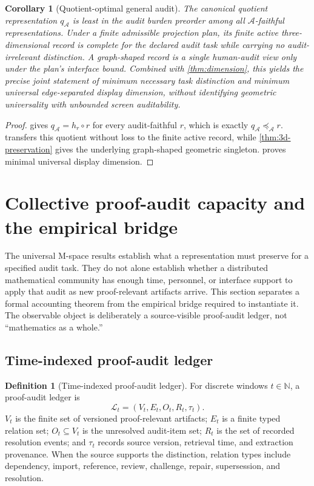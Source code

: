 \documentclass[11pt]{article}
\newcommand{\N}{\mathbb N}
\newcommand{\qA}{q_{\mathcal A}}
\newcommand{\mcA}{\mathcal A}
\newcommand{\Ledger}{\ensuremath{\mathscr L}}
\theoremstyle{plain}
\newtheorem{corollary}[theorem]{Corollary}
\theoremstyle{definition}
\newtheorem{definition}[theorem]{Definition}
\theoremstyle{remark}
\begin{document}
\begin{corollary}[Quotient-optimal general audit]
\label{cor:maxaud}
The canonical quotient representation $\qA$ is least in the audit burden preorder among all $\mcA$-faithful representations.  Under a finite admissible projection plan, its finite active three-dimensional record is complete for the declared audit task while carrying no audit-irrelevant distinction.  A graph-shaped record is a single human-audit view only under the plan's interface bound.  Combined with \cref{thm:dimension}, this yields the precise joint statement of minimum necessary task distinction and minimum universal edge-separated display dimension, without identifying geometric universality with unbounded screen auditability.
\end{corollary}

\begin{proof}
 gives $\qA=h_r\circ r$ for every audit-faithful $r$, which is exactly $\qA\preceq_{\mcA} r$.   transfers this quotient without loss to the finite
active record, while \cref{thm:3d-preservation} gives the underlying
graph-shaped geometric singleton.   proves minimal universal
display dimension.
\end{proof}


\section{Collective proof-audit capacity and the empirical bridge}
\label{sec:collective-capacity}

The universal M-space results establish what a representation must preserve for a
specified audit task.  They do not alone establish whether a distributed
mathematical community has enough time, personnel, or interface support to apply
that audit as new proof-relevant artifacts arrive.  This section separates a
formal accounting theorem from the empirical bridge required to instantiate it.
The observable object is deliberately a source-visible proof-audit ledger, not
``mathematics as a whole.''

\subsection{Time-indexed proof-audit ledger}

\begin{definition}[Time-indexed proof-audit ledger]
\label{def:ledger}
For discrete windows $t\in\N$, a proof-audit ledger is
\[
  \Ledger_t=(V_t,E_t,O_t,R_t,\tau_t).
\]
$V_t$ is the finite set of versioned proof-relevant artifacts; $E_t$ is a finite
typed relation set; $O_t\subseteq V_t$ is the unresolved audit-item set; $R_t$
is the set of recorded resolution events; and $\tau_t$ records source version,
retrieval time, and extraction provenance.  When the source supports the
distinction, relation types include dependency, import, reference, review,
challenge, repair, supersession, and resolution.
\end{definition}
\end{document}
